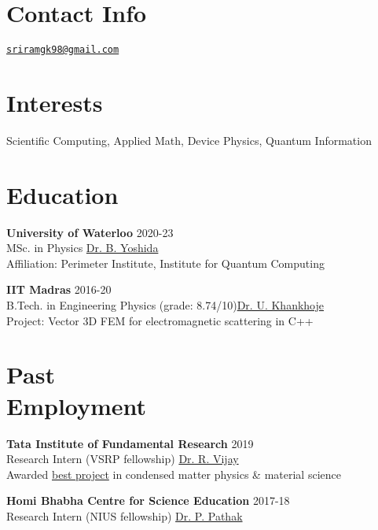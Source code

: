 \documentclass[margin,line]{res}
\begin{document}

\begin{resume}
\section{\sc Contact Info}
\href{mailto:sgopalakrishnan@pitp.ca}{\texttt{sriramgk98@gmail.com}}

\section{\sc Interests}
Scientific Computing, Applied Math, Device Physics, Quantum Information

\section{\sc Education}
{\bf University of Waterloo} \hfill 2020-23\\
MSc. in Physics \hfill  \href{https://perimeterinstitute.ca/people/beni-yoshida}{\sffamily Dr. B. Yoshida}\\
Affiliation: Perimeter Institute, Institute for Quantum Computing

{\bf IIT Madras} \hfill 2016-20 \\
B.Tech. in Engineering Physics (grade: 8.74/10)\hfill  \href{http://www.ee.iitm.ac.in/uday/index.html}{\sffamily Dr. U. Khankhoje}\\
Project: Vector 3D FEM for electromagnetic scattering in C++

\section{\sc Past\\Employment}
{\bf Tata Institute of Fundamental Research} \hfill 2019\\
Research Intern (VSRP fellowship) \hfill \href{https://www.tifr.res.in/~quantro/people.html}{\sffamily Dr. R. Vijay}\\
Awarded \href{https://sriramgkn.github.io/docs/vsrp_awardcertificate.pdf}{\sffamily best project} in condensed matter physics \& material science

{\bf Homi Bhabha Centre for Science Education} \hfill 2017-18\\
Research Intern (NIUS fellowship) \hfill \href{https://www.hbcse.tifr.res.in/people/scientific/praveen-p-pathak}{\sffamily Dr. P. Pathak}


\end{resume}
\end{document}
